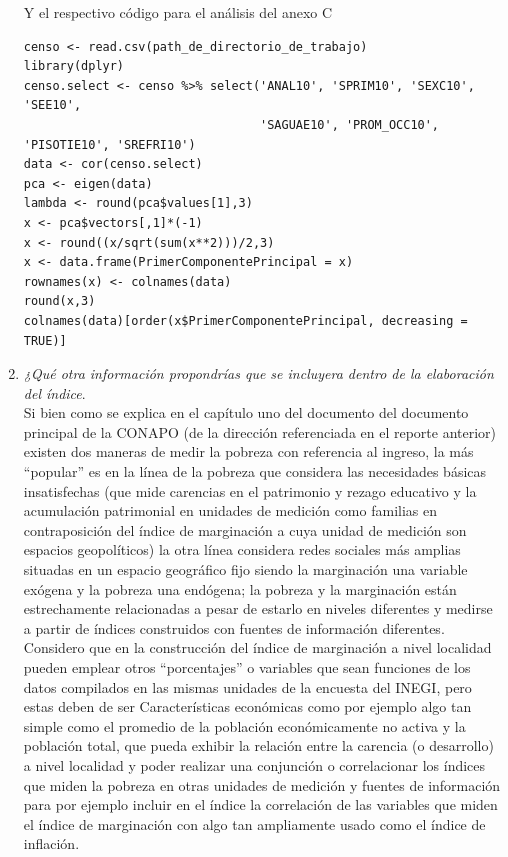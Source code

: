 \documentclass[paper=letter, fontsize=11pt]{scrartcl}
\numberwithin{equation}{section} %
\numberwithin{figure}{section} %
\numberwithin{table}{section} %
\begin{document}
\begin{enumerate}
\begin{enumerate}
\begin{lstlisting}[style=customc,basicstyle=\scriptsize]
\end{lstlisting} 
\end{enumerate}
Y el respectivo código para el análisis del anexo C 
\begin{lstlisting}[style=customc,basicstyle=\scriptsize]
censo <- read.csv(path_de_directorio_de_trabajo)
library(dplyr)
censo.select <- censo %>% select('ANAL10', 'SPRIM10', 'SEXC10', 'SEE10',
                                 'SAGUAE10', 'PROM_OCC10', 'PISOTIE10', 'SREFRI10')
data <- cor(censo.select)
pca <- eigen(data)
lambda <- round(pca$values[1],3)
x <- pca$vectors[,1]*(-1)
x <- round((x/sqrt(sum(x**2)))/2,3)
x <- data.frame(PrimerComponentePrincipal = x)
rownames(x) <- colnames(data)
round(x,3)
colnames(data)[order(x$PrimerComponentePrincipal, decreasing = TRUE)]
\end{lstlisting} 
\item
\textit{¿Qué otra información propondrías que se incluyera dentro de la elaboración del índice}.\\
Si bien como se explica en el capítulo uno del documento del documento principal de la CONAPO (de la dirección referenciada en el reporte anterior) existen dos maneras de medir la pobreza con referencia al ingreso, la más “popular” es en la línea de la pobreza que considera las necesidades básicas insatisfechas (que mide carencias en el patrimonio y rezago educativo y la acumulación patrimonial en unidades de medición como familias en contraposición del índice de marginación a cuya unidad de medición son espacios geopolíticos) la otra línea considera redes sociales más amplias situadas en un espacio geográfico fijo siendo la marginación una variable exógena y la pobreza una endógena; la pobreza y la marginación están estrechamente relacionadas a pesar de estarlo en niveles diferentes y medirse a partir de índices construidos con fuentes de información diferentes. Considero que en la construcción del índice de marginación a nivel localidad pueden emplear otros “porcentajes” o variables que sean funciones de los datos compilados en las mismas unidades de la encuesta del INEGI, pero estas deben de ser Características económicas como por ejemplo algo tan simple como el promedio de la población económicamente no activa y la población total, que pueda exhibir la relación entre la carencia (o desarrollo) a nivel localidad y poder realizar una conjunción o correlacionar los índices que miden la pobreza en otras unidades de medición y fuentes de información para por ejemplo incluir en el índice la correlación de las variables que miden el índice de marginación con algo tan ampliamente usado como el índice de inflación.


\end{enumerate}
\end{document}

